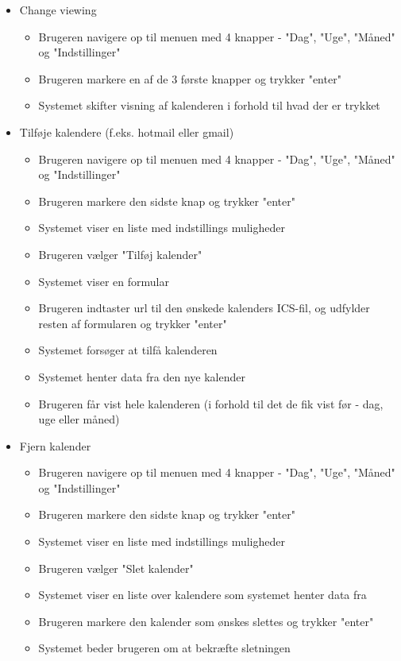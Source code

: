 \begin{itemize}
   \item Change viewing
   \begin{itemize}
   \item Brugeren navigere op til menuen med 4 knapper - "Dag", "Uge", "Måned" og "Indstillinger"
   \item Brugeren markere en af de 3 første knapper og trykker "enter"
   \item Systemet skifter visning af kalenderen i forhold til hvad der er trykket
   \end{itemize}
   \item Tilføje kalendere (f.eks. hotmail eller gmail)
   \begin{itemize}
   \item Brugeren navigere op til menuen med 4 knapper - "Dag", "Uge", "Måned" og "Indstillinger"
   \item Brugeren markere den sidste knap og trykker "enter"
   \item Systemet viser en liste med indstillings muligheder
   \item Brugeren vælger "Tilføj kalender"
   \item Systemet viser en formular
   \item Brugeren indtaster url til den ønskede kalenders ICS-fil, og udfylder resten af formularen og trykker "enter"
   \item Systemet forsøger at tilfå kalenderen
   \item Systemet henter data fra den nye kalender
   \item Brugeren får vist hele kalenderen (i forhold til det de fik vist før - dag, uge eller måned)
   \end{itemize}
   \item Fjern kalender
   \begin{itemize}
   \item Brugeren navigere op til menuen med 4 knapper - "Dag", "Uge", "Måned" og "Indstillinger"
   \item Brugeren markere den sidste knap og trykker "enter"
   \item Systemet viser en liste med indstillings muligheder
   \item Brugeren vælger "Slet kalender"
   \item Systemet viser en liste over kalendere som systemet henter data fra
   \item Brugeren markere den kalender som ønskes slettes og trykker "enter"
   \item Systemet beder brugeren om at bekræfte sletningen

\end{itemize}
\end{itemize}
